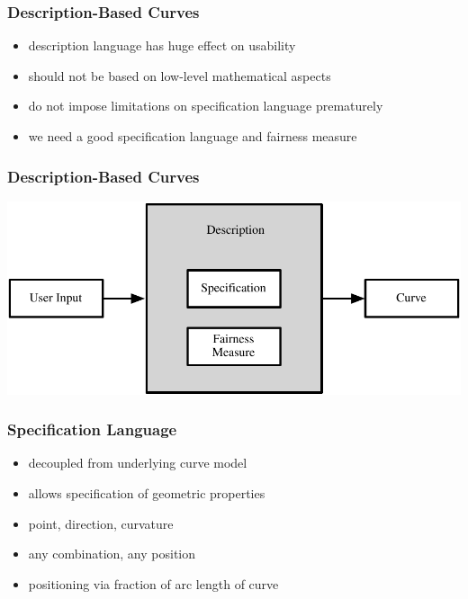 \documentclass{beamer}
\begin{document}
		\begin{frame}
			\frametitle{Description-Based Curves}
			\begin{itemize}
				\item description language has huge effect on usability
				\item should not be based on low-level mathematical aspects %
				\item do not impose limitations on specification language prematurely %
				\item we need a good specification language and fairness measure
			\end{itemize}
		\end{frame}
	
		\begin{frame}
			\frametitle{Description-Based Curves}
			\begin{centering}
				\includegraphics[width=\textwidth]{../resources/description-based_curves.pdf}\\
			\end{centering}
		\end{frame}
		
		\begin{frame}
			\frametitle{Specification Language}
			\begin{itemize}
				\item decoupled from underlying curve model
				\item allows specification of geometric properties
				\item point, direction, curvature
				\item any combination, any position
				\item positioning via fraction of arc length of curve
			\end{itemize}
		\end{frame}
\end{document}
